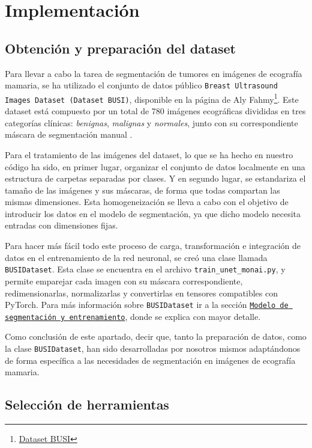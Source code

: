 \documentclass[12pt]{article}
\begin{document}
\section{Implementación}
\subsection{Obtención y preparación del dataset}

Para llevar a cabo la tarea de segmentación de tumores en imágenes de ecografía mamaria, se ha utilizado el conjunto de datos público \texttt{Breast Ultrasound Images Dataset (Dataset BUSI)}, disponible en la página de Aly Fahmy\footnote{\href{https://scholar.cu.edu.eg/?q=afahmy/pages/dataset}{Dataset BUSI}}. Este dataset está compuesto por un total de 780 imágenes ecográficas divididas en tres categorías clínicas: \textit{benignas}, \textit{malignas} y \textit{normales}, junto con su correspondiente máscara de segmentación manual \cite{al2020dataset}.

Para el tratamiento de las imágenes del dataset, lo que se ha hecho en nuestro código ha sido, en primer lugar, organizar el conjunto de datos localmente en una estructura de carpetas separadas por clases. Y en segundo lugar, se estandariza el tamaño de las imágenes y sus máscaras, de forma que todas compartan las mismas dimensiones. Esta homogeneización se lleva a cabo con el objetivo de introducir los datos en el modelo de segmentación, ya que dicho modelo necesita entradas con dimensiones fijas.

Para hacer más fácil todo este proceso de carga, transformación e integración de datos en el entrenamiento de la red neuronal, se creó una clase llamada \texttt{BUSIDataset}. Esta clase se encuentra en el archivo \texttt{train\_unet\_monai.py}, y permite emparejar cada imagen con su máscara correspondiente, redimensionarlas, normalizarlas y convertirlas en tensores compatibles con PyTorch. Para más información sobre \texttt{BUSIDataset} ir a la sección \hyperref[sec:entrenamiento]{\texttt{Modelo de segmentación y entrenamiento}}, donde se explica con mayor detalle.

Como conclusión de este apartado, decir que, tanto la preparación de datos, como la clase \texttt{BUSIDataset}, han sido desarrolladas por nosotros mismos adaptándonos de forma específica a las necesidades de segmentación en imágenes de ecografía mamaria.

\subsection{Selección de herramientas}
\end{document}
